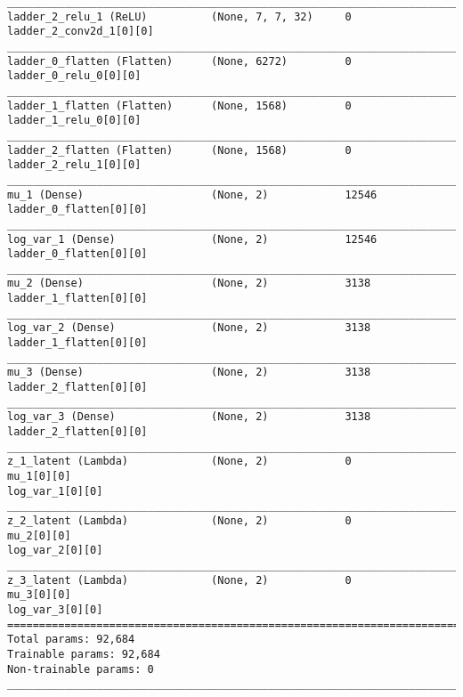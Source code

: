 \begin{lstlisting}[caption={\ac{VLAE} network encoder used for network sparsity experiments with half the number of feature maps},captionpos=b,basicstyle=\tiny, label={lst:sparsity-vlae-encoder-28-fm2}]
__________________________________________________________________________________________________
ladder_2_relu_1 (ReLU)          (None, 7, 7, 32)     0           ladder_2_conv2d_1[0][0]
__________________________________________________________________________________________________
ladder_0_flatten (Flatten)      (None, 6272)         0           ladder_0_relu_0[0][0]
__________________________________________________________________________________________________
ladder_1_flatten (Flatten)      (None, 1568)         0           ladder_1_relu_0[0][0]
__________________________________________________________________________________________________
ladder_2_flatten (Flatten)      (None, 1568)         0           ladder_2_relu_1[0][0]
__________________________________________________________________________________________________
mu_1 (Dense)                    (None, 2)            12546       ladder_0_flatten[0][0]
__________________________________________________________________________________________________
log_var_1 (Dense)               (None, 2)            12546       ladder_0_flatten[0][0]
__________________________________________________________________________________________________
mu_2 (Dense)                    (None, 2)            3138        ladder_1_flatten[0][0]
__________________________________________________________________________________________________
log_var_2 (Dense)               (None, 2)            3138        ladder_1_flatten[0][0]
__________________________________________________________________________________________________
mu_3 (Dense)                    (None, 2)            3138        ladder_2_flatten[0][0]
__________________________________________________________________________________________________
log_var_3 (Dense)               (None, 2)            3138        ladder_2_flatten[0][0]
__________________________________________________________________________________________________
z_1_latent (Lambda)             (None, 2)            0           mu_1[0][0]
log_var_1[0][0]
__________________________________________________________________________________________________
z_2_latent (Lambda)             (None, 2)            0           mu_2[0][0]
log_var_2[0][0]
__________________________________________________________________________________________________
z_3_latent (Lambda)             (None, 2)            0           mu_3[0][0]
log_var_3[0][0]
==================================================================================================
Total params: 92,684
Trainable params: 92,684
Non-trainable params: 0
__________________________________________________________________________________________________
\end{lstlisting}